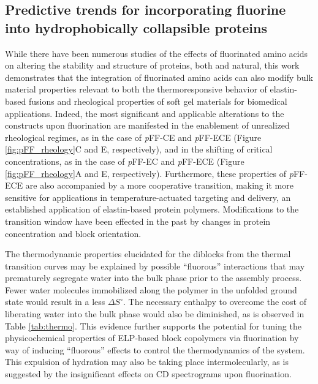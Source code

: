 \begin{refsection}
\subsection{Predictive trends for incorporating fluorine into hydrophobically
collapsible proteins}
\label{sec:predictive_trends}
While there have been numerous studies of the effects of fluorinated amino acids
on altering the stability and structure of proteins, both  and
natural,\cite{Megeed2002,Meyer2002,Wright2002,Simnick2007,Baker2011,URRY1974,Urry1985}
this work demonstrates that the integration of fluorinated amino acids can also
modify bulk material properties relevant to both the thermoresponsive behavior
of elastin-based fusions and rheological properties of soft gel materials for
biomedical applications. Indeed, the most significant and applicable alterations
to the constructs upon fluorination are manifested in the enablement of unrealized
rheological regimes, as in the case of \emph{p}FF-CE and \emph{p}FF-ECE (Figure
\ref{fig:pFF_rheology}C and E, respectively), and in the shifting of critical
concentrations, as in the case of \emph{p}FF-EC and \emph{p}FF-ECE (Figure
\ref{fig:pFF_rheology}A and E, respectively). Furthermore, these properties of
\emph{p}FF-ECE are also accompanied by a more cooperative transition, making it more
sensitive for applications in temperature-actuated targeting and delivery, an
established application of elastin-based protein
polymers.\cite{Simnick2007,Chilkoti2002a} Modifications to the transition window
have been effected in the past by changes in protein concentration and block
orientation.\cite{Yamaoka2003,Meyer2002} 

\label{sec:thermo_discussion}
The thermodynamic properties elucidated for the diblocks from the thermal
transition curves may be explained by possible ``fluorous'' interactions that
may prematurely segregate water into the bulk phase prior to the assembly
process. Fewer water molecules immobilized along the polymer in the unfolded
ground state would result in a less ${\Delta S^{\circ}}$. The necessary enthalpy
to overcome the cost of liberating water into the bulk phase would also be
diminished, as is observed in Table \ref{tab:thermo}. This evidence further
supports the potential for tuning the physicochemical properties of ELP-based
block copolymers via fluorination by way of inducing ``fluorous'' effects to
control the thermodynamics of the system. This expulsion of hydration may also
be taking place intermolecularly, as is suggested by the insignificant effects
on CD spectrograms upon fluorination.


\end{refsection}

